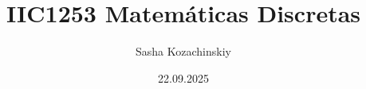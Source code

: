\documentclass{beamer}
\title{IIC1253 Matemáticas Discretas}
\author{Sasha Kozachinskiy}
\institute{DCC UC}
\date{22.09.2025}
\begin{document}
\begin{frame}
\end{frame}

\begin{frame}
\end{frame}

\begin{frame}
\end{frame}

\begin{frame}
\end{frame}

\begin{frame}
\end{frame}

\begin{frame}
\end{frame}

\begin{frame}
\end{frame}

\begin{frame}
\end{frame}

\begin{frame}
\end{frame}

\begin{frame}
\end{frame}

\begin{frame}
\end{frame}

\begin{frame}
\end{frame}

\begin{frame}
\end{frame}

\begin{frame}
\end{frame}

\begin{frame}
\end{frame}

\begin{frame}
\end{frame}

\begin{frame}
\end{frame}

\begin{frame}
\end{frame}
\end{document}
